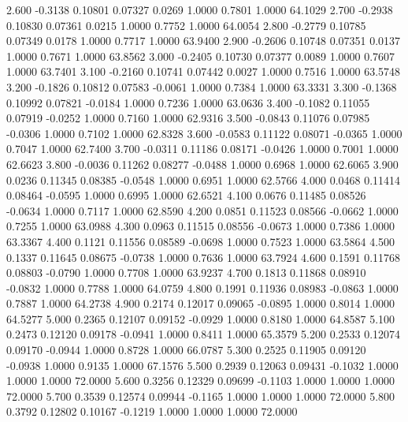    2.600  -0.3138   0.10801   0.07327   0.0269   1.0000   0.7801   1.0000  64.1029
   2.700  -0.2938   0.10830   0.07361   0.0215   1.0000   0.7752   1.0000  64.0054
   2.800  -0.2779   0.10785   0.07349   0.0178   1.0000   0.7717   1.0000  63.9400
   2.900  -0.2606   0.10748   0.07351   0.0137   1.0000   0.7671   1.0000  63.8562
   3.000  -0.2405   0.10730   0.07377   0.0089   1.0000   0.7607   1.0000  63.7401
   3.100  -0.2160   0.10741   0.07442   0.0027   1.0000   0.7516   1.0000  63.5748
   3.200  -0.1826   0.10812   0.07583  -0.0061   1.0000   0.7384   1.0000  63.3331
   3.300  -0.1368   0.10992   0.07821  -0.0184   1.0000   0.7236   1.0000  63.0636
   3.400  -0.1082   0.11055   0.07919  -0.0252   1.0000   0.7160   1.0000  62.9316
   3.500  -0.0843   0.11076   0.07985  -0.0306   1.0000   0.7102   1.0000  62.8328
   3.600  -0.0583   0.11122   0.08071  -0.0365   1.0000   0.7047   1.0000  62.7400
   3.700  -0.0311   0.11186   0.08171  -0.0426   1.0000   0.7001   1.0000  62.6623
   3.800  -0.0036   0.11262   0.08277  -0.0488   1.0000   0.6968   1.0000  62.6065
   3.900   0.0236   0.11345   0.08385  -0.0548   1.0000   0.6951   1.0000  62.5766
   4.000   0.0468   0.11414   0.08464  -0.0595   1.0000   0.6995   1.0000  62.6521
   4.100   0.0676   0.11485   0.08526  -0.0634   1.0000   0.7117   1.0000  62.8590
   4.200   0.0851   0.11523   0.08566  -0.0662   1.0000   0.7255   1.0000  63.0988
   4.300   0.0963   0.11515   0.08556  -0.0673   1.0000   0.7386   1.0000  63.3367
   4.400   0.1121   0.11556   0.08589  -0.0698   1.0000   0.7523   1.0000  63.5864
   4.500   0.1337   0.11645   0.08675  -0.0738   1.0000   0.7636   1.0000  63.7924
   4.600   0.1591   0.11768   0.08803  -0.0790   1.0000   0.7708   1.0000  63.9237
   4.700   0.1813   0.11868   0.08910  -0.0832   1.0000   0.7788   1.0000  64.0759
   4.800   0.1991   0.11936   0.08983  -0.0863   1.0000   0.7887   1.0000  64.2738
   4.900   0.2174   0.12017   0.09065  -0.0895   1.0000   0.8014   1.0000  64.5277
   5.000   0.2365   0.12107   0.09152  -0.0929   1.0000   0.8180   1.0000  64.8587
   5.100   0.2473   0.12120   0.09178  -0.0941   1.0000   0.8411   1.0000  65.3579
   5.200   0.2533   0.12074   0.09170  -0.0944   1.0000   0.8728   1.0000  66.0787
   5.300   0.2525   0.11905   0.09120  -0.0938   1.0000   0.9135   1.0000  67.1576
   5.500   0.2939   0.12063   0.09431  -0.1032   1.0000   1.0000   1.0000  72.0000
   5.600   0.3256   0.12329   0.09699  -0.1103   1.0000   1.0000   1.0000  72.0000
   5.700   0.3539   0.12574   0.09944  -0.1165   1.0000   1.0000   1.0000  72.0000
   5.800   0.3792   0.12802   0.10167  -0.1219   1.0000   1.0000   1.0000  72.0000
